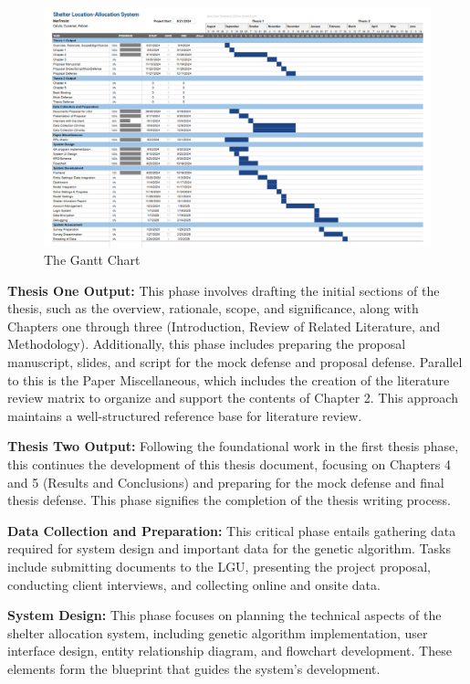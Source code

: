 \begin{figure}[h!]
	\caption{The Gantt Chart}
	\centering
	\includegraphics[width=\textwidth]{Gantt}
\end{figure}

\textbf{Thesis One Output:} This phase involves drafting the initial sections of the thesis, such as the overview, rationale, scope, and significance, along with Chapters one through three (Introduction, Review of Related Literature, and Methodology). Additionally, this phase includes preparing the proposal manuscript, slides, and script for the mock defense and proposal defense. Parallel to this is the Paper Miscellaneous, which includes the creation of the literature review matrix to organize and support the contents of Chapter 2. This approach maintains a well-structured reference base for literature review.

\textbf{Thesis Two Output:} Following the foundational work in the first thesis phase, this continues the development of this thesis document, focusing on Chapters 4 and 5 (Results and Conclusions) and preparing for the mock defense and final thesis defense. This phase signifies the completion of the thesis writing process.

\textbf{Data Collection and Preparation:} This critical phase entails gathering data required for system design and important data for the genetic algorithm. Tasks include submitting documents to the LGU, presenting the project proposal, conducting client interviews, and collecting online and onsite data.

\textbf{System Design:} This phase focuses on planning the technical aspects of the shelter allocation system, including genetic algorithm implementation, user interface design, entity relationship diagram, and flowchart development. These elements form the blueprint that guides the system's development.


